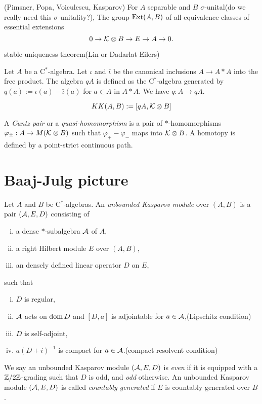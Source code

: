 \documentclass{../../large}
\begin{document}
(Pimsner, Popa, Voiculescu, Kasparov)
For $A$ separable and $B$ $\sigma$-unital(do we really need this $\sigma$-unitality?),
The group $\operatorname{Ext}(A,B)$ of all equivalence classes of essential extensions
\[0\to\mathcal{K}\otimes B\to E\to A\to0.\]






stable uniqueness theorem(Lin or Dadarlat-Eilers)


\begin{prb}
Let $A$ be a C$^*$-algebra.
Let $\iota$ and $\bar\iota$ be the canonical inclusions $A\to A*A$ into the free product.
The algebra $qA$ is defined as the C$^*$-algebra generated by $q(a):=\iota(a)-\bar\iota(a)$ for $a\in A$ in $A*A$.
We have $q:A\to qA$.
\end{prb}

\begin{prb}
\[KK(A,B):=[qA,\mathcal{K}\otimes B]\]

\end{prb}


A \emph{Cuntz pair} or a \emph{quasi-homomorphism} is a pair of $*$-homomorphisms $\varphi_\pm:A\to M(\mathcal{K}\otimes B)$ such that $\varphi_+-\varphi_-$ maps into $\mathcal{K}\otimes B$.
A homotopy is defined by a point-strict continuous path.

\section{Baaj-Julg picture}

\begin{prb}
Let $A$ and $B$ be C$^*$-algebras.
An \emph{unbounded Kasparov module} over $(A,B)$ is a pair $(\mathcal{A},E,D)$ consisting of
\begin{enumerate}[(i)]
\item a dense $*$-subalgebra $\mathcal{A}$ of $A$,
\item a right Hilbert module $E$ over $(A,B)$,
\item an densely defined linear operator $D$ on $E$,
\end{enumerate}
such that 
\begin{enumerate}[(i)]
\item $D$ is regular,
\item $\mathcal{A}$ acts on $\operatorname{dom} D$ and $\bar{[D,a]}$ is adjointable for $a\in\mathcal{A}$,\hfill(Lipschitz condition)
\item $D$ is self-adjoint,
\item $a(D+i)^{-1}$ is compact for $a\in\mathcal{A}$.\hfill(compact resolvent condition)
\end{enumerate}
We say an unbounded Kasparov module $(\mathcal{A},E,D)$ is \emph{even} if it is equipped with a $\mathbb{Z}/2\mathbb{Z}$-grading such that $D$ is odd, and \emph{odd} otherwise.
An unbounded Kasparov module $(\mathcal{A},E,D)$ is called \emph{countably generated} if $E$ is countably generated over $B$.
\end{prb}
\end{document}
